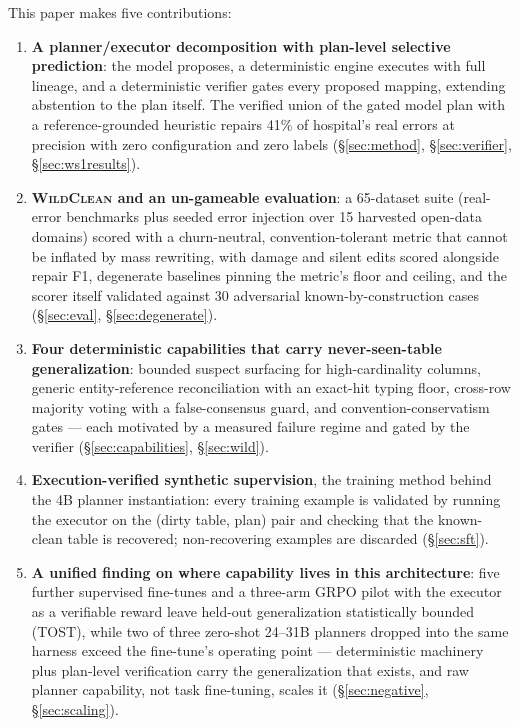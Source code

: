 \documentclass[11pt]{article}
\begin{document}
This paper makes five contributions:
\begin{enumerate}
\item \textbf{A planner/executor decomposition with plan-level selective prediction}:
  the model proposes, a deterministic engine executes with full lineage, and a
  deterministic verifier gates every proposed mapping, extending abstention to the plan
  itself. The verified union of the gated model plan with a reference-grounded
  heuristic repairs 41\% of hospital's \hospErrors{} real errors at \unionGatePrec{}
  precision with zero configuration and zero labels (\S\ref{sec:method},
  \S\ref{sec:verifier}, \S\ref{sec:ws1results}).
\item \textbf{\textsc{WildClean} and an un-gameable evaluation}: a 65-dataset suite
  (real-error benchmarks plus seeded error injection over 15 harvested open-data
  domains) scored with a churn-neutral, convention-tolerant metric that cannot be
  inflated by mass rewriting, with damage and silent edits scored alongside repair F1,
  degenerate baselines pinning the metric's floor and ceiling, and the scorer itself
  validated against 30 adversarial known-by-construction cases (\S\ref{sec:eval},
  \S\ref{sec:degenerate}).
\item \textbf{Four deterministic capabilities that carry never-seen-table
  generalization}: bounded suspect surfacing for high-cardinality columns, generic
  entity-reference reconciliation with an exact-hit typing floor, cross-row majority
  voting with a false-consensus guard, and convention-conservatism gates --- each
  motivated by a measured failure regime and gated by the verifier
  (\S\ref{sec:capabilities}, \S\ref{sec:wild}).
\item \textbf{Execution-verified synthetic supervision}, the training method behind
  the 4B planner instantiation: every training example is validated by running the
  executor on the (dirty table, plan) pair and checking that the known-clean table is
  recovered; non-recovering examples are discarded (\S\ref{sec:sft}).
\item \textbf{A unified finding on where capability lives in this architecture}: five
  further supervised fine-tunes and a three-arm GRPO pilot with the executor as a
  verifiable reward leave held-out generalization statistically bounded (TOST), while
  two of three zero-shot 24--31B planners dropped into the same harness exceed the
  fine-tune's operating point --- deterministic machinery plus plan-level verification carry the
  generalization that exists, and raw planner capability, not task fine-tuning, scales
  it (\S\ref{sec:negative}, \S\ref{sec:scaling}).
\end{enumerate}
\end{document}
